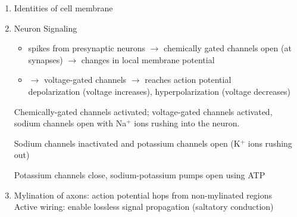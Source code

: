 \documentclass[11pt]{article}
\begin{document}
\begin{enumerate}
    \item Identities of cell membrane
    \item Neuron Signaling 
    \begin{itemize}
        \item spikes from presynaptic neurons $\rightarrow$ chemically gated channels open (at synapses) $\rightarrow$ changes in local membrane potential
        \item $\rightarrow$ voltage-gated channels $\rightarrow$ reaches action potential\\
        depolarization (voltage increases), hyperpolarization (voltage decreases)
    \end{itemize}

        \begin{center}
    \end{center}
     Chemically-gated channels activated; voltage-gated channels activated, sodium channels open with Na$^+$ ions rushing into the neuron.\par
     Sodium channels inactivated and potassium channels open (K$^+$ ions rushing out)\par
     Potassium channels close, sodium-potassium pumps open using ATP
    \item Mylination of axons: action potential hops from non-mylinated regions\\
    Active wiring: enable lossless signal propagation (saltatory conduction)
\end{enumerate}
\end{document}
